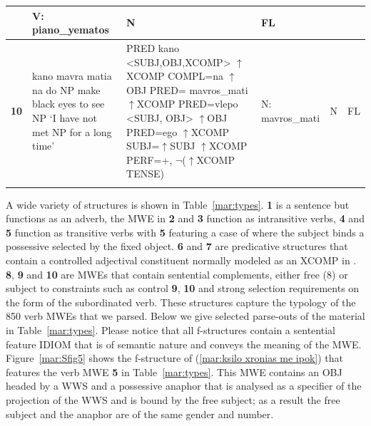 \documentclass[output=paper]{langsci/langscibook}
\begin{document}
\begin{table}[htbp]
{\begin{tabular}{l@{~}p{5.6cm}p{6.4cm}p{3.3cm}ll}
  &
  V: \newline
  piano\_yematos
  &
  N
  &
  FL
  \\
  \midrule
  \textbf{10}
  &
  kano mavra matia na do NP \newline
  make black eyes to see NP \newline
  `I have not met NP for a long time’
  &
  PRED kano <SUBJ,OBJ,XCOMP> \newline
  $\uparrow$XCOMP COMPL=na \newline
  $\uparrow$OBJ PRED= mavros\_mati \newline
  $\uparrow$XCOMP PRED=vlepo <SUBJ, OBJ> \newline
  $\uparrow$OBJ PRED=ego \newline
  $\uparrow$XCOMP SUBJ=$\uparrow$SUBJ \newline
  $\uparrow$XCOMP PERF=+, $\neg$($\uparrow$XCOMP TENSE)
  &
  N: \newline
  mavros\_mati
  &
  N
  & 
  FL
  \tabularnewline
  \lspbottomrule
\end{tabular}
}
\end{table}
A wide variety of structures is shown in Table~\ref{mar:types}. \textbf{1} is a sentence but functions as an adverb, the MWE in \textbf{2} and \textbf{3} function as intransitive verbs, \textbf{4} and \textbf{5} function as transitive verbs with \textbf{5} featuring a case of where the subject binds a possessive selected by the fixed object. \textbf{6} and \textbf{7} are predicative structures that contain a controlled adjectival constituent normally modeled as an XCOMP in . \textbf{8}, \textbf{9} and \textbf{10} are MWEs that contain sentential complements, either free (8) or subject to constraints such as control \textbf{9}, \textbf{10} and strong selection requirements on the form of the subordinated verb. These structures capture the typology of the 850 verb MWEs that we parsed. 
Below we give selected parse-outs of the material in Table~\ref{mar:types}. Please notice that all f-structures contain a sentential feature IDIOM that is of semantic nature and conveys the meaning of the MWE.
Figure~\ref{mar:Sfig5} shows the f-structure of (\ref{mar:ksilo xronias me ipok}) that features the verb MWE \textbf{5} in Table~\ref{mar:types}. This MWE contains an OBJ  headed by a WWS and a possessive anaphor that is analysed as a specifier of  the projection of the WWS and is bound by the free subject; as a result the free subject and the anaphor are of the same gender and number.  
\end{document}
